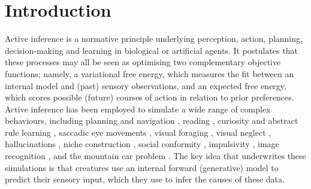 \documentclass[review,12pt,authoryear]{elsarticle}
\begin{document}
\section{Introduction}
Active inference is a normative principle underlying perception, action, planning, decision-making and learning in biological or artificial agents. It postulates that these processes may all be seen as optimising two complementary objective functions; namely, a variational free energy, which measures the fit between an internal model and (past) sensory observations, and an expected free energy, which scores possible (future) courses of action in relation to prior preferences. Active inference has been employed to simulate a wide range of complex behaviours, including planning and navigation \citep{kaplanPlanningNavigationActive2018}, reading \citep{fristonDeepTemporalModels2018}, curiosity and abstract rule learning \citep{fristonActiveInferenceCuriosity2017}, saccadic eye movements \citep{parrActiveInferenceAnatomy2018}, visual foraging \citep{mirzaSceneConstructionVisual2016,parrUncertaintyEpistemicsActive2017}, visual neglect \citep{parrComputationalAnatomyVisual2018}, hallucinations \citep{adamsComputationalAnatomyPsychosis2013}, niche construction \citep{bruinebergFreeenergyMinimizationJoint2018,constantVariationalApproachNiche2018}, social conformity \citep{constantRegimesExpectationsActive2019}, impulsivity \citep{mirzaImpulsivityActiveInference2019}, image recognition \citep{millidgeImplementingPredictiveProcessing2019}, and the mountain car problem \citep{catalBayesianPolicySelection2019,fristonReinforcementLearningActive2009,fristonWhatValueAccumulated2012}. The key idea that underwrites these simulations is that creatures use an internal forward (generative) model to predict their sensory input, which they use to infer the causes of these data.
\end{document}
